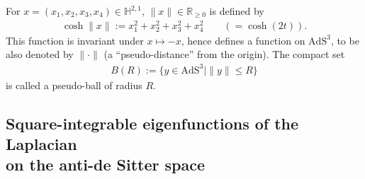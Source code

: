\documentclass[10pt,a4paper]{amsart}
\numberwithin{equation}{section}
\begin{document}
\begin{Definition}
\label{def-pball}
For $x = (x_1,x_2,x_3,x_4)\in\mathbb{H}^{2,1}$, $\|x\|\in\mathbb{R}_{\geq0}$
is defined by
\begin{gather*}
\cosh\|x\|:=x_1^2 + x_2^2 + x_3^2 + x_4^2\qquad (= \cosh(2t)).
\end{gather*}
This function is invariant under $x\mapsto -x$, hence defines
a function on $\mathrm{AdS}^{3}$,
to be also denoted by $\|\cdot\|$ (a ``pseudo-distance'' from the origin).
The compact set
\begin{gather*}
B(R) := \big\{y\in\mathrm{AdS}^{3} \mid \|y\| \leq R\big\}
\end{gather*}
is called a pseudo-ball of radius $R$.
\end{Definition}

\subsection[Square-integrable eigenfunctions of the Laplacian on the anti-de Sitter space] {Square-integrable eigenfunctions of the Laplacian \\on the anti-de Sitter space}\label{preliminary-spherical}
\end{document}
